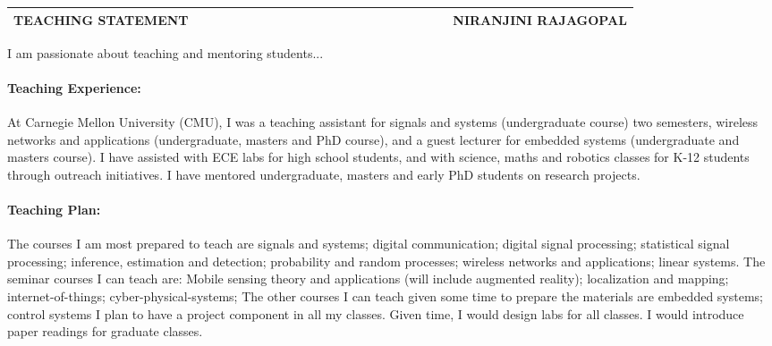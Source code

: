 \documentclass[10pt]{article}
\date{}
\begin{document}

\begin{table}
\color{blue}
\begin{tabular*}{\textwidth}{l r}
\large\textbf{TEACHING STATEMENT} & 
\hfill \ \ \ \ \ \ \ \ \ \ \ \ \ \ \ \ \ \ \ \
\ \ \ \ \ \ \ \ \ \ \ \ \ \ \ 
\large\textbf{NIRANJINI RAJAGOPAL}\\
\hline
\end{tabular*}

\end{table}

I am passionate about teaching and mentoring students... %

\paragraph{Teaching Experience:}
At Carnegie Mellon University (CMU), I was a teaching assistant for signals and systems (undergraduate course) two semesters, wireless networks and applications (undergraduate, masters and PhD course), and a guest lecturer for embedded systems (undergraduate and masters course). I have assisted with ECE labs for high school students, and with science, maths and robotics classes for K-12 students through outreach initiatives. I have mentored undergraduate, masters and early PhD students on research projects.  

\paragraph{Teaching Plan:}
The courses I am most prepared to teach are signals and systems; digital communication; digital signal processing; statistical signal processing; inference, estimation and detection; probability and random processes; wireless networks and applications; linear systems. 
The seminar courses I can teach are: Mobile sensing theory and applications (will include augmented reality); localization and mapping; internet-of-things; cyber-physical-systems; %
The other courses I can teach given some time to prepare the materials are embedded systems; control systems%
I plan to have a project component in all my classes. Given time, I would design labs for all classes. I would introduce paper readings for graduate classes.
\end{document}

